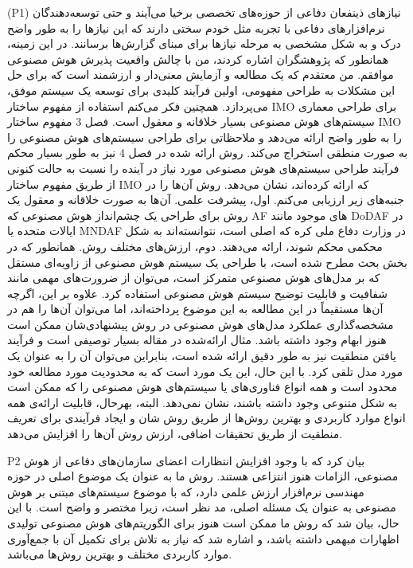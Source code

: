 \documentclass[a4paper,10pt]{article}
\begin{document}
                    \begin{addinfo}

                        (P1) نیازهای ذینفعان دفاعی از حوزه‌های تخصصی برخیا می‌آیند و حتی توسعه‌دهندگان نرم‌افزارهای دفاعی با تجربه مثل خودم سختی دارند که این نیازها را به طور واضح درک و به شکل مشخصی به مرحله نیازها برای مبنای گزارش‌ها برسانند. در این زمینه، همانطور که پژوهشگران اشاره کردند، من با چالش واقعیت پذیرش هوش مصنوعی موافقم. من معتقدم که یک مطالعه و آزمایش معنی‌دار و ارزشمند است که برای حل این مشکلات به طراحی مفهومی، اولین فرآیند کلیدی برای توسعه یک سیستم موفق، می‌پردازد. همچنین فکر می‌کنم استفاده از مفهوم ساختار IMO برای طراحی معماری سیستم‌های هوش مصنوعی بسیار خلاقانه و معقول است. فصل 3 مفهوم ساختار IMO را به طور واضح ارائه می‌دهد و ملاحظاتی برای طراحی سیستم‌های هوش مصنوعی را به صورت منطقی استخراج می‌کند. روش ارائه شده در فصل 4 نیز به طور بسیار محکم فرآیند طراحی سیستم‌های هوش مصنوعی مورد نیاز در آینده را نسبت به حالت کنونی از طریق مفهوم ساختار IMO که ارائه کرده‌اند، نشان می‌دهد. روش آن‌ها را در جنبه‌های زیر ارزیابی می‌کنم. اول، پیشرفت علمی. آن‌ها به صورت خلاقانه و معقول یک روش برای طراحی یک چشم‌انداز هوش مصنوعی که AF های موجود مانند DoDAF در ایالات متحده یا MNDAF در وزارت دفاع ملی کره که اصلی است، نتوانسته‌اند به شکل محکمی محکم شوند، ارائه می‌دهند. دوم، ارزش‌های مختلف روش. همانطور که در بخش بحث مطرح شده است، با طراحی یک سیستم هوش مصنوعی از زاویه‌ای مستقل که بر مدل‌های هوش مصنوعی متمرکز است، می‌توان از ضرورت‌های مهمی مانند شفافیت و قابلیت توضیح سیستم هوش مصنوعی استفاده کرد. علاوه بر این، اگرچه آن‌ها مستقیماً در این مطالعه به این موضوع پرداخته‌اند، اما می‌توان آن‌ها را هم در مشخصه‌گذاری عملکرد مدل‌های هوش مصنوعی در روش پیشنهادی‌شان ممکن است هنوز ابهام وجود داشته باشد. مثال ارائه‌شده در مقاله بسیار توصیفی است و فرآیند یافتن منطقیت نیز به طور دقیق ارائه شده است، بنابراین می‌توان آن را به عنوان یک مورد مدل تلقی کرد. با این حال، این یک مورد است که به محدودیت مورد مطالعه خود محدود است و همه انواع فناوری‌های یا سیستم‌های هوش مصنوعی را که ممکن است به شکل متنوعی وجود داشته باشند، نشان نمی‌دهد. البته، بهرحال، قابلیت ارائه‌ی همه انواع موارد کاربردی و بهترین روش‌ها از طریق روش شان و ایجاد فرآیندی برای تعریف منطقیت از طریق تحقیقات اضافی، ارزش روش آن‌ها را افزایش می‌دهد.

                    \end{addinfo}

                    P2 بیان کرد که با وجود افزایش انتظارات اعضای سازمان‌های دفاعی از هوش مصنوعی، الزامات هنوز انتزاعی هستند. روش ما به عنوان یک موضوع اصلی در حوزه مهندسی نرم‌افزار ارزش علمی دارد، که با موضوع سیستم‌های مبتنی بر هوش مصنوعی به عنوان یک مسئله اصلی، مد نظر است، زیرا مختصر و واضح است. با این حال، بیان شد که روش ما ممکن است هنوز برای الگوریتم‌های هوش مصنوعی تولیدی اظهارات مبهمی داشته باشد، و اشاره شد که نیاز به تلاش برای تکمیل آن با جمع‌آوری موارد کاربردی مختلف و بهترین روش‌ها می‌باشد.
\end{document}
